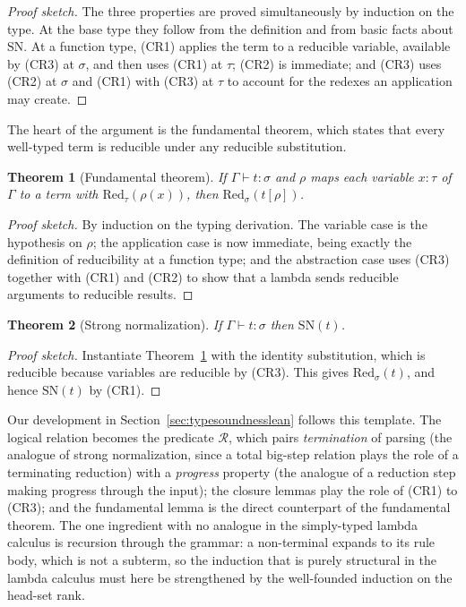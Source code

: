 \documentclass[preprint,12pt]{elsarticle}
\newtheorem{Theorem}{Theorem}
\theoremstyle{definition}
\newenvironment{proofsketch}
  {\renewcommand{\qedsymbol}{$\blacksquare$}\begin{proof}[Proof sketch]}
  {\end{proof}}
\begin{document}
\begin{proofsketch}
The three properties are proved simultaneously by induction
on the type. At the base type they follow from the definition and from basic
facts about $\mathrm{SN}$. At a function type, (CR1) applies the term to a
reducible variable, available by (CR3) at $\sigma$, and then uses (CR1) at
$\tau$; (CR2) is immediate; and (CR3) uses (CR2) at $\sigma$ and (CR1) with
(CR3) at $\tau$ to account for the redexes an application may create.
\end{proofsketch}

The heart of the argument is the fundamental theorem, which states that every
well-typed term is reducible under any reducible substitution.

\begin{Theorem}[Fundamental theorem]\label{thm:fundamental-stlc}
If $\Gamma \vdash t : \sigma$ and $\rho$ maps each variable $x{:}\tau$ of
$\Gamma$ to a term with $\mathrm{Red}_\tau(\rho(x))$, then
$\mathrm{Red}_\sigma(t[\rho])$.
\end{Theorem}

\begin{proofsketch}
By induction on the typing derivation. The variable case is
the hypothesis on $\rho$; the application case is now immediate, being exactly
the definition of reducibility at a function type; and the abstraction case uses
(CR3) together with (CR1) and (CR2) to show that a lambda sends reducible
arguments to reducible results.
\end{proofsketch}

\begin{Theorem}[Strong normalization]\label{thm:sn-stlc}
If $\Gamma \vdash t : \sigma$ then $\mathrm{SN}(t)$.
\end{Theorem}

\begin{proofsketch}
Instantiate Theorem~\ref{thm:fundamental-stlc} with the
identity substitution, which is reducible because variables are reducible by
(CR3). This gives $\mathrm{Red}_\sigma(t)$, and hence $\mathrm{SN}(t)$ by (CR1).
\end{proofsketch}

Our development in Section~\ref{sec:typesoundnesslean} follows this template. The
logical relation becomes the predicate $\mathcal{R}$, which pairs
\emph{termination} of parsing (the analogue of strong normalization, since a total
big-step relation plays the role of a terminating reduction) with a
\emph{progress} property (the analogue of a reduction step making progress through
the input); the closure lemmas play the role of (CR1) to (CR3); and the
fundamental lemma is the direct counterpart of the fundamental theorem. The one
ingredient with no analogue in the simply-typed lambda calculus is recursion
through the grammar: a non-terminal expands to its rule body, which is not a
subterm, so the induction that is purely structural in the lambda calculus must
here be strengthened by the well-founded induction on the head-set rank.
\end{document}
